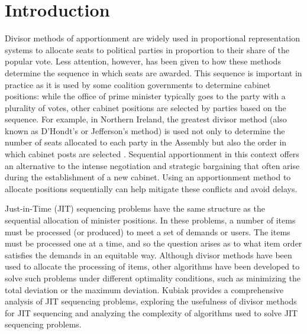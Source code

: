 \documentclass[pdflatex,sn-mathphys-num]{sn-jnl}
\theoremstyle{thmstyleone}%
\theoremstyle{thmstyletwo}%
\theoremstyle{thmstylethree}%
\begin{document}



\maketitle


\section{Introduction}


Divisor methods of apportionment are widely used in proportional representation systems to allocate seats to political parties in proportion to their share of the popular vote. Less attention, however, has been given to how these methods determine the sequence in which seats are awarded. This sequence is important in practice as it is used by some coalition governments to determine cabinet positions: while the office of prime minister typically goes to the party with a plurality of votes, other cabinet positions are selected by parties based on the sequence.  For example, in Northern Ireland, the greatest divisor method (also known as D'Hondt's or Jefferson's method) is used not only to determine the number of seats allocated to each party in the Assembly but also the order in which cabinet posts are selected \cite{OGE}. Sequential apportionment in this context offers an alternative to the intense negotiation and strategic bargaining that often arise during the establishment of a new cabinet.  Using an apportionment method to allocate positions sequentially can help mitigate these conflicts and avoid delays.

Just-in-Time (JIT) sequencing problems have the same structure as the sequential allocation of minister positions.  In these problems, a number of  items must be processed (or produced) to meet a set of demands or  users. The items must be processed one at a time, and so the question arises as to what item order satisfies the demands in an equitable way.  Although divisor methods have been used to allocate the processing of items, other algorithms have been developed to solve such problems under different optimality conditions, such as minimizing the total deviation or the maximum deviation.  Kubiak  \cite{K} provides a comprehensive analysis of JIT sequencing problems, exploring the usefulness of divisor methods for JIT sequencing and analyzing the complexity of algorithms used to solve JIT sequencing problems.
\end{document}
